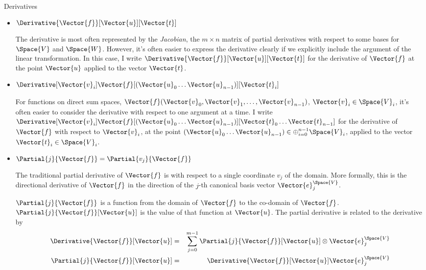 \begin{plSection}{Derivatives}
\begin{itemize}
\item $\Derivative{\Vector{f}}[\Vector{u}][\Vector{t}]$

The derivative is most often represented by the \textit{Jacobian},
the $m \times n$ matrix of partial derivatives
with respect to some bases for $\Space{V}$ and $\Space{W}$.
However, it's often easier to express the derivative clearly if we
explicitly include the argument of the linear transformation.
In this case, I write 
$\Derivative{\Vector{f}}[\Vector{u}][\Vector{t}]$
for the derivative of $\Vector{f}$ at the point $\Vector{u}$
applied to the vector $\Vector{t}$.

\item $\Derivative[\Vector{v}_i]{\Vector{f}}
[(\Vector{u}_0 \ldots \Vector{u}_{n-1})][\Vector{t}_i]$

For functions on direct sum spaces,
$\Vector{f}(\Vector{v}_0,\Vector{v}_1, \ldots, \Vector{v}_{n-1})$, 
$\Vector{v}_i \in \Space{V}_i$,
it's often easier to consider the derivative
with respect to one argument at a time.
I write 
$\Derivative[\Vector{v}_i]{\Vector{f}}
[(\Vector{u}_0 \ldots \Vector{u}_{n-1})]
[\Vector{t}_0 \ldots \Vector{t}_{n-1}]$
for the derivative of $\Vector{f}$ with respect to $\Vector{v}_i$,
at the point 
$(\Vector{u}_0 \ldots \Vector{u}_{n-1}) \in 
\oplus_{i=0}^{n-1} \Space{V}_i$,
applied to the vector $\Vector{t}_i \in \Space{V}_i$.

\item $\Partial{j}{\Vector{f}} = \Partial{v_j}{\Vector{f}}$

The traditional partial derivative of $\Vector{f}$ is with respect to
a single coordinate $v_j$ of the domain.
More formally, this is the directional derivative of $\Vector{f}$
in the direction of the $j$-th canonical basis vector 
$\Vector{e}_j^{\Space{V}}$.

$\Partial{j}{\Vector{f}}$ is a function from the domain 
of $\Vector{f}$ to the co-domain of $\Vector{f}$.
$\Partial{j}{\Vector{f}}[\Vector{u}]$ 
is the value of that function 
at $\Vector{u}$.
The partial derivative is related to the derivative by
\begin{eqnarray}
\label{eq:partial-full-dervatives}
\Derivative{\Vector{f}}[\Vector{u}]
& = &
\sum_{j=0}^{m-1} \Partial{j}{\Vector{f}}[\Vector{u}] 
\otimes \Vector{e}_j^{\Space{V}}
\\
\Partial{j}{\Vector{f}}[\Vector{u}]
& = &
\Derivative{\Vector{f}}[\Vector{u}] \Vector{e}_j^{\Space{V}}
\nonumber
\end{eqnarray}


\end{itemize}
\end{plSection}
